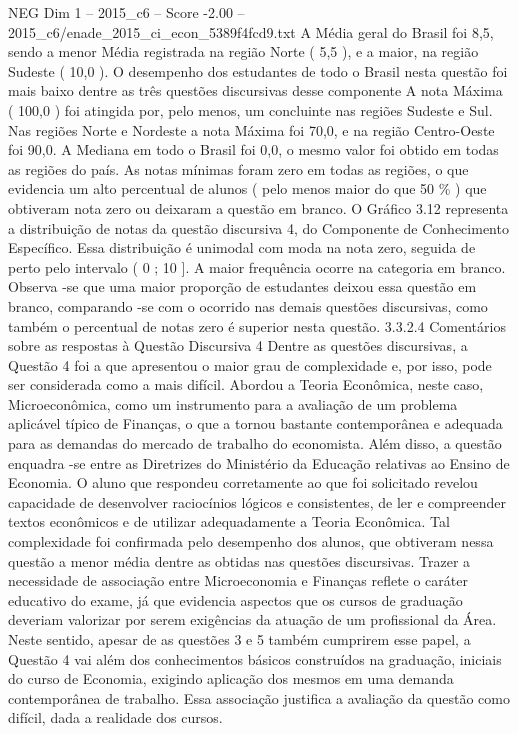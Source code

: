 \begin{textsample}{NEG Dim 1 – 2015\_c6 – Score -2.00 – 2015\_c6/enade\_2015\_ci\_econ\_5389f4fcd9.txt}
A Média geral do Brasil foi 8,5, sendo a menor Média registrada na região Norte ( 5,5 ), e a maior, na região Sudeste ( 10,0 ).
O desempenho dos estudantes de todo o Brasil nesta questão foi mais baixo dentre as três questões discursivas desse componente A nota Máxima ( 100,0 ) foi atingida por, pelo menos, um concluinte nas regiões Sudeste e Sul.
Nas regiões Norte e Nordeste a nota Máxima foi 70,0, e na região Centro-Oeste foi 90,0.
A Mediana em todo o Brasil foi 0,0, o mesmo valor foi obtido em todas as regiões do país.
As notas mínimas foram zero em todas as regiões, o que evidencia um alto percentual de alunos ( pelo menos maior do que 50 \% ) que obtiveram nota zero ou deixaram a questão em branco.
O Gráfico 3.12 representa a distribuição de notas da questão discursiva 4, do Componente de Conhecimento Específico.
Essa distribuição é unimodal com moda na nota zero, seguida de perto pelo intervalo ( 0 ; 10 ].
A maior frequência ocorre na categoria em branco.
Observa -se que uma maior proporção de estudantes deixou essa questão em branco, comparando -se com o ocorrido nas demais questões discursivas, como também o percentual de notas zero é superior nesta questão. 3.3.2.4 Comentários sobre as respostas à Questão Discursiva 4 Dentre as questões discursivas, a Questão 4 foi a que apresentou o maior grau de complexidade e, por isso, pode ser considerada como a mais difícil.
Abordou a Teoria Econômica, neste caso, Microeconômica, como um instrumento para a avaliação de um problema aplicável típico de Finanças, o que a tornou bastante contemporânea e adequada para as demandas do mercado de trabalho do economista.
Além disso, a questão enquadra -se entre as Diretrizes do Ministério da Educação relativas ao Ensino de Economia.
O aluno que respondeu corretamente ao que foi solicitado revelou capacidade de desenvolver raciocínios lógicos e consistentes, de ler e compreender textos econômicos e de utilizar adequadamente a Teoria Econômica.
Tal complexidade foi confirmada pelo desempenho dos alunos, que obtiveram nessa questão a menor média dentre as obtidas nas questões discursivas.
Trazer a necessidade de associação entre Microeconomia e Finanças reflete o caráter educativo do exame, já que evidencia aspectos que os cursos de graduação deveriam valorizar por serem exigências da atuação de um profissional da Área.
Neste sentido, apesar de as questões 3 e 5 também cumprirem esse papel, a Questão 4 vai além dos conhecimentos básicos construídos na graduação, iniciais do curso de Economia, exigindo aplicação dos mesmos em uma demanda contemporânea de trabalho.
Essa associação justifica a avaliação da questão como difícil, dada a realidade dos cursos.

\end{textsample}
